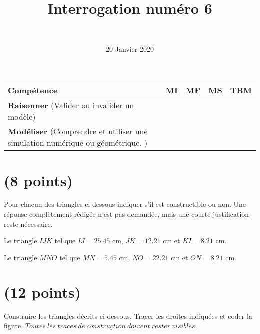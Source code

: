 \documentclass[a4paper,11pt]{exam}
\author{\ }
\date{20 Janvier 2020}
\title{Interrogation num\'ero 6}
\begin{document}
%	

\maketitle


\begin{small}
	\begin{center}
		\begin{tabular}{|@{\ }l@{\ }|@{\ }c@{\ }|@{\ }c@{\ }|@{\ }c@{\ }|@{\ }c@{\ }|}
			\hline
			\textbf{Compétence} & \textbf{MI} & \textbf{MF} & \textbf{MS} & \textbf{TBM} \\
			
			\hline	
			 \textbf{Raisonner} (Valider ou invalider un modèle) &  \ \ & \ \ & \ \ & \ \  \\
			\hline
			\textbf{Modéliser} (Comprendre et utiliser une simulation numérique ou géométrique. )&  \ \ & \ \ & \ \ & \ \  \\			
			\hline
		\end{tabular}
	\end{center}
\end{small}


\section{(8 points)}

Pour chacun des triangles ci-dessous indiquer s'il est constructible ou non. Une réponse complètement rédigée n'est pas demandée, mais une courte justification reste nécessaire.

\begin{questions}
	\question[4]
	Le triangle $IJK$ tel que $IJ = \num{25.45}$ cm, $JK = \num{12.21}$ cm et $KI = \num{8.21}$ cm.
	
	\fillwithdottedlines{2cm}
	
	\question[4]
	
	Le triangle $MNO$ tel que $MN = \num{5.45}$ cm, $NO = \num{22.21}$ cm et $ON = \num{8.21}$ cm.
	
	\fillwithdottedlines{2cm}
\end{questions}

\newpage

\section{(12 points)}

Construire les triangles décrits ci-dessous. Tracer les droites indiquées et coder la figure. $\underline{Toutes\  les\  traces\  de\  construction\  doivent\  rester\  visibles.}$
\end{document}
